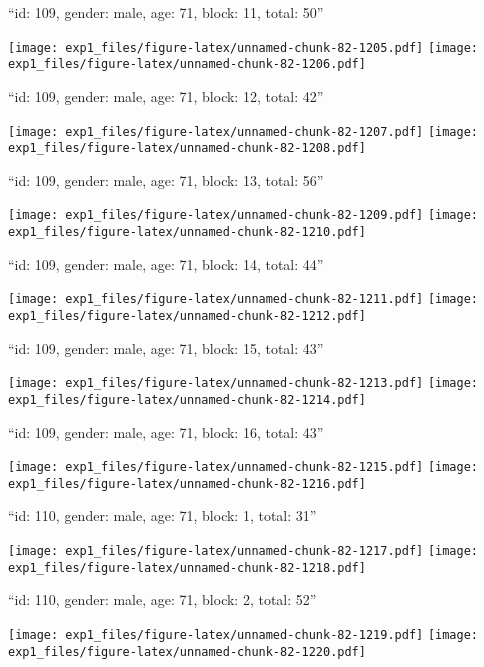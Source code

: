 \documentclass[11pt,,]{article}
\begin{document}
\newpage
[1] 

``id: 109, gender: male, age: 71, block: 11, total: 50''

\texttt{[image: exp1\_files/figure-latex/unnamed-chunk-82-1205.pdf]}
\texttt{[image: exp1\_files/figure-latex/unnamed-chunk-82-1206.pdf]}

\newpage
[1] 

``id: 109, gender: male, age: 71, block: 12, total: 42''

\texttt{[image: exp1\_files/figure-latex/unnamed-chunk-82-1207.pdf]}
\texttt{[image: exp1\_files/figure-latex/unnamed-chunk-82-1208.pdf]}

\newpage
[1] 

``id: 109, gender: male, age: 71, block: 13, total: 56''

\texttt{[image: exp1\_files/figure-latex/unnamed-chunk-82-1209.pdf]}
\texttt{[image: exp1\_files/figure-latex/unnamed-chunk-82-1210.pdf]}

\newpage
[1] 

``id: 109, gender: male, age: 71, block: 14, total: 44''

\texttt{[image: exp1\_files/figure-latex/unnamed-chunk-82-1211.pdf]}
\texttt{[image: exp1\_files/figure-latex/unnamed-chunk-82-1212.pdf]}

\newpage
[1] 

``id: 109, gender: male, age: 71, block: 15, total: 43''

\texttt{[image: exp1\_files/figure-latex/unnamed-chunk-82-1213.pdf]}
\texttt{[image: exp1\_files/figure-latex/unnamed-chunk-82-1214.pdf]}

\newpage
[1] 

``id: 109, gender: male, age: 71, block: 16, total: 43''

\texttt{[image: exp1\_files/figure-latex/unnamed-chunk-82-1215.pdf]}
\texttt{[image: exp1\_files/figure-latex/unnamed-chunk-82-1216.pdf]}

\newpage
[1] 

``id: 110, gender: male, age: 71, block: 1, total: 31''

\texttt{[image: exp1\_files/figure-latex/unnamed-chunk-82-1217.pdf]}
\texttt{[image: exp1\_files/figure-latex/unnamed-chunk-82-1218.pdf]}

\newpage
[1] 

``id: 110, gender: male, age: 71, block: 2, total: 52''

\texttt{[image: exp1\_files/figure-latex/unnamed-chunk-82-1219.pdf]}
\texttt{[image: exp1\_files/figure-latex/unnamed-chunk-82-1220.pdf]}
\end{document}
